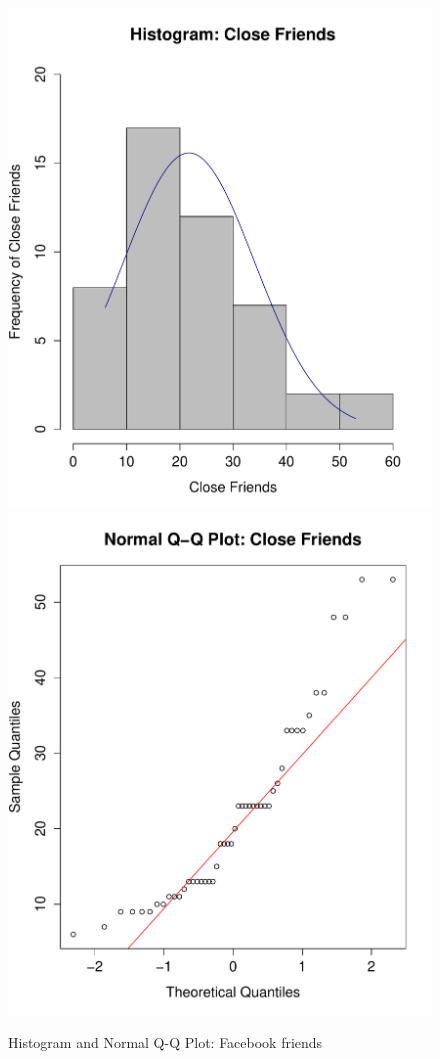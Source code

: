 \begin{figure}[H]
\caption{Histogram and Normal Q-Q Plot: Facebook friends}
\centering
\includegraphics[scale=0.35]{./img/hist_closefriends.pdf}
\includegraphics[scale=0.35]{./img/qqplot_closefriends.pdf}
\end{figure}

